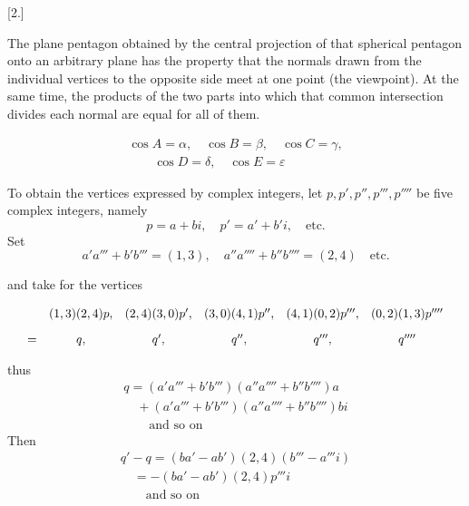 \begingroup
\renewcommand{\arraystretch}{1.45}
\fancyhead[L]{}
\par\medskip{}\centerline{[2.]}\nobreak\smallskip
The plane pentagon obtained by the central projection of that spherical pentagon onto an arbitrary plane has the property that the normals drawn from the individual vertices to the opposite side meet at one point (the viewpoint). At the same time, the products of the two parts into which that common intersection divides each normal are equal for all of them.

\providecommand{\EqOverGt}{\mathrel{\substack{=\\>}}}


\begin{center}
\resizebox{.60\linewidth}{!}{}
\end{center}
\[
\begin{gathered}\cos A=\alpha,\quad \cos B=\beta,\quad \cos C=\gamma,\\[9pt]\quad{}\quad \cos D=\delta,\quad \cos E=\varepsilon\end{gathered}
\]

To obtain the vertices expressed by complex integers, let $p,p',p'',p''',p''''$ be five complex integers, namely
\[
p=a+bi,\quad p'=a'+b'i,\quad\text{etc.}
\]
Set
\[
a'a'''+b'b'''=(1,3),\quad a''a''''+b''b''''=(2,4)\quad\text{etc.}
\]

and take for the vertices
\par\nopagebreak%
\begingroup\small\setlength{\arraycolsep}{2pt}\[
\resizebox{.98\linewidth}{!}{$\displaystyle \begin{array}{rccccc} & (1,3)(2,4)p, & (2,4)(3,0)p', & (3,0)(4,1)p'', & (4,1)(0,2)p''', & (0,2)(1,3)p''''\\[9pt] = & q, & q', & q'', & q''', & q'''' \end{array}$}
\]\endgroup\par%

thus
\[
\begin{gathered} q=(a'a'''+b'b''')(a''a''''+b''b'''')a \\[9pt]\quad{}+(a'a'''+b'b''')(a''a''''+b''b'''')bi\\[9pt] \qquad\text{and so on} \end{gathered}
\]
Then
\[
\begin{gathered} q'-q=(ba'-ab')(2,4)(b'''-a'''i)\\[9pt]\quad{}=-(ba'-ab')(2,4)p'''i\\[9pt] \qquad\text{and so on} \end{gathered}
\]




